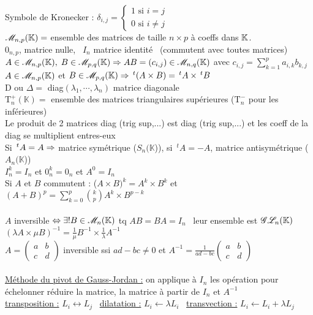 \documentclass[12 pt]{book}
\begin{document}
\begin{flushleft}
\begin{doublespace}

	Symbole de Kronecker : $ \delta_{i,j} = \left\{\begin{array}{ll} 1\text{ si } i=j \\  0 \text{ si } i\ne j \end{array} \right.$ \\
	$\mathscr{M}_{n,p}(\mathbb{K}) = $ ensemble des matrices de taille $n\times p$ à coeffs dans $\mathbb{K}$.\\
	$0_{n,p}$, matrice nulle, \ $I_n$ matrice identité \ (commutent avec toutes matrices)\\
	$A\in \mathscr{M}_{n,p}(\mathbb{K}),\; B\in \mathscr{M}_{p,q}(\mathbb{K}) \Rightarrow AB=(c_{i,j}) \in \mathscr{M}_{n,q}(\mathbb{K})$ avec $c_{i,j} = \sum_{k= 1}^p a_{i,k} b_{k,j}$\\
	$A\in \mathscr{M}_{n,p}(\mathbb{K})$ et $B\in \mathscr{M}_{p,q}(\mathbb{K}) \Rightarrow \,^t(A\times B) = \,^tA\times \,^tB$\\
	D ou $\Delta =$ diag$(\lambda_1,\cdots,\lambda_n)$ matrice diagonale\\
	$\text{T}_n^+(\mathbb{K}) =$ ensemble des matrices triangulaires supérieures ($\text{T}_n^-$ pour les inférieures)\\
	Le produit de 2 matrices diag (trig sup,...) est diag (trig sup,...) et les coeff de la diag se multiplient entres-eux\\
	Si $\,^tA = A \Rightarrow$ matrice symétrique ($S_n(\mathbb{K}$)), si $\,^tA = -A$, matrice antisymétrique ($A_n(\mathbb{K}$))\\
	$I_n^k = I_n$ et $0_n^k = 0_n$ et $A^0 = I_n$ \\
	Si $A$ et $B$ commutent : ($A\times B)^k = A^k \times B^k$ et $(A + B)^p = \sum\limits_{k=0}^p \binom{k}{p} A^k \times B^{p-k}$\\
	\text{ }\\
	$A$ inversible $\Leftrightarrow \exists ! B\in \mathscr{M}_n(\mathbb{K}) $ tq $ AB=BA=I_n$ \ leur ensemble est $\mathscr{G}\mathscr{L}_n(\mathbb{K})$\\
	$(\lambda A \times \mu B)^{- 1} = \frac{1}{\mu}B^{- 1} \times \frac{1}{\lambda}A^{- 1}$\\ 
	$A = \begin{pmatrix} a & b \\ c & d \end{pmatrix}$ inversible ssi $ad- bc \ne 0$ et $A^{- 1} = \frac{1}{ad - bc}\begin{pmatrix} a & b \\ c & d \end{pmatrix}$\\
	
	\text{ }\\
	\underline{Méthode du pivot de Gauss-Jordan :} on applique à $I_n$ les opération pour échelonner réduire la matrice, la matrice à partir de $I_n$ et $A^{- 1}$\\
	\underline{transposition :} $L_i \leftrightarrow L_j$ \ \underline{dilatation :} $L_i \leftarrow \lambda L_i$ \  \underline{transvection :} $L_i \leftarrow L_i + \lambda L_j$\\


\end{doublespace}
\end{flushleft}
\end{document}
